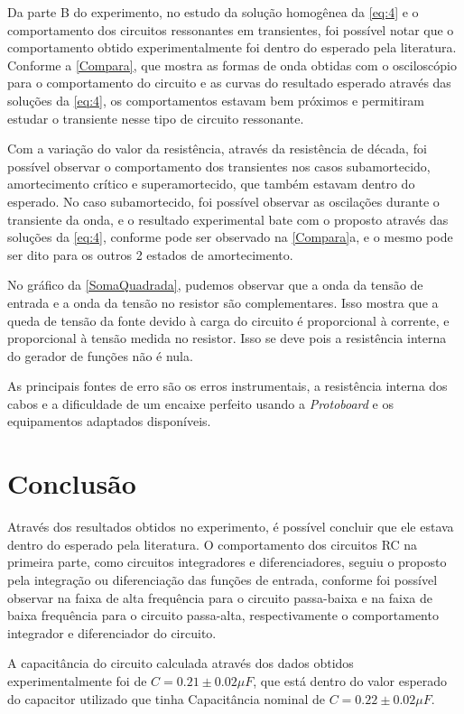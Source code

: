 \documentclass[11pt,a4paper]{article}
\begin{document}
    Da parte B do experimento, no estudo da solução homogênea da \cref{eq:4} e o comportamento dos circuitos ressonantes em transientes, foi possível notar que o comportamento obtido experimentalmente foi dentro do esperado pela literatura. Conforme a \cref{Compara}, que mostra as formas de onda obtidas com o osciloscópio para o comportamento do circuito e as curvas do resultado esperado através das soluções da \cref{eq:4}, os comportamentos estavam bem próximos e permitiram estudar o transiente nesse tipo de circuito ressonante.
    
    Com a variação do valor da resistência, através da resistência de década, foi possível observar o comportamento dos transientes nos casos subamortecido, amortecimento crítico e superamortecido, que também estavam dentro do esperado. No caso subamortecido, foi possível observar as oscilações durante o transiente da onda, e o resultado experimental bate com o proposto através das soluções da \cref{eq:4}, conforme pode ser observado na \cref{Compara}a, e o mesmo pode ser dito para os outros 2 estados de amortecimento.
    
    No gráfico da \cref{SomaQuadrada}, pudemos observar que a onda da tensão de entrada e a onda da tensão no resistor são complementares. Isso mostra que a queda de tensão da fonte devido à carga do circuito é proporcional à corrente, e proporcional à tensão medida no resistor. Isso se deve pois a resistência interna do gerador de funções não é nula.
    
    As principais fontes de erro são os erros instrumentais, a resistência interna dos cabos e a dificuldade de um encaixe perfeito usando a \textit{Protoboard} e os equipamentos adaptados disponíveis.
    
    
\section{Conclusão}

    Através dos resultados obtidos no experimento, é possível concluir que ele estava dentro do esperado pela literatura. O comportamento dos circuitos RC na primeira parte, como circuitos integradores e diferenciadores, seguiu o proposto pela integração ou diferenciação das funções de entrada, conforme foi possível observar na faixa de alta frequência para o circuito passa-baixa e na faixa de baixa frequência para o circuito passa-alta, respectivamente o comportamento integrador e diferenciador do circuito.
    
    A capacitância do circuito calculada através dos dados obtidos experimentalmente foi de $C=0.21\pm 0.02 \mu F$, que está dentro do valor esperado do capacitor utilizado que tinha Capacitância nominal de $C=0.22\pm 0.02 \mu F$.
    
\end{document}
